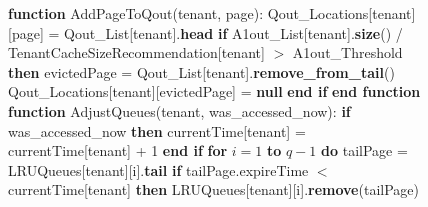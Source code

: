\newpage

\begin{figure}[htbp]
    \centering
    \begin{minipage}{\linewidth}
    \begin{algorithm}[H]
        \begin{algorithmic}
            \STATE \textbf{function} AddPageToQout(tenant, page):
            \STATE \hspace{\algorithmicindent} Qout\_Locations[tenant][page] = Qout\_List[tenant].\textbf{head}
            \STATE \hspace{\algorithmicindent} \textbf{if} A1out\_List[tenant].\textbf{size}() / TenantCacheSizeRecommendation[tenant] $>$ A1out\_Threshold \textbf{then}
            \STATE \hspace{\algorithmicindent} \hspace{\algorithmicindent} evictedPage = Qout\_List[tenant].\textbf{remove\_from\_tail}()
            \STATE \hspace{\algorithmicindent} \hspace{\algorithmicindent} Qout\_Locations[tenant][evictedPage] = \textbf{null}
            \STATE \hspace{\algorithmicindent} \textbf{end if}
            \STATE \textbf{end function}
            \STATE 
            \STATE \textbf{function} AdjustQueues(tenant, was\_accessed\_now):
            \STATE \hspace{\algorithmicindent} \textbf {if} was\_accessed\_now \textbf{then}
            \STATE \hspace{\algorithmicindent} \hspace{\algorithmicindent} currentTime[tenant] = currentTime[tenant] + 1
            \STATE \hspace{\algorithmicindent} \textbf{end if}
            \STATE \hspace{\algorithmicindent} \textbf{for} $i = 1$ \textbf{to} $q - 1$ \textbf{do}
            \STATE \hspace{\algorithmicindent} \hspace{\algorithmicindent} tailPage = LRUQueues[tenant][i].\textbf{tail}
            \STATE \hspace{\algorithmicindent} \hspace{\algorithmicindent} \textbf{if} tailPage.expireTime $<$ currentTime[tenant] \textbf{then}
            \STATE \hspace{\algorithmicindent} \hspace{\algorithmicindent} \hspace{\algorithmicindent} LRUQueues[tenant][i].\textbf{remove}(tailPage)

\end{algorithmic}
\end{algorithm}
\end{minipage}
\end{figure}
